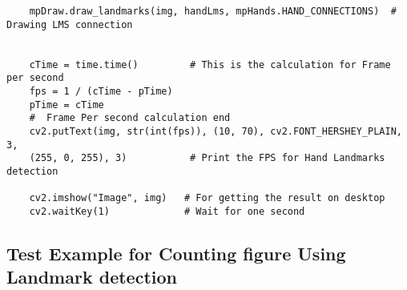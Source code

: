 \begin{verbatim}
	mpDraw.draw_landmarks(img, handLms, mpHands.HAND_CONNECTIONS)  # Drawing LMS connection
	
	
	cTime = time.time()         # This is the calculation for Frame per second
	fps = 1 / (cTime - pTime)
	pTime = cTime
	#  Frame Per second calculation end
	cv2.putText(img, str(int(fps)), (10, 70), cv2.FONT_HERSHEY_PLAIN, 3,
	(255, 0, 255), 3)           # Print the FPS for Hand Landmarks detection
	
	cv2.imshow("Image", img)   # For getting the result on desktop
	cv2.waitKey(1)             # Wait for one second
\end{verbatim}


\subsection{Test Example for Counting figure Using Landmark detection}

